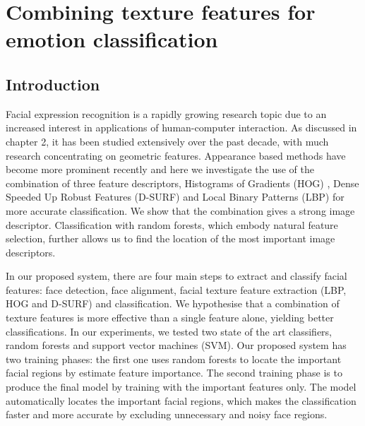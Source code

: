  

\chapter{Combining texture features for emotion classification}
\label{Ch_4}

\minitoc


\section{Introduction}

Facial expression recognition is a rapidly growing research topic due to an increased interest in applications of human-computer interaction. As discussed in chapter 2, it has been studied extensively over the past decade, with much research concentrating on geometric features.  Appearance based methods have become more prominent recently \citep{mishra2015survey,kumari2016fusion,yuqian2016action} and here we investigate the use of the combination of three feature descriptors, Histograms of Gradients (HOG) \citep{dalal2005histograms}, Dense Speeded Up Robust Features (D-SURF) \citep{lowe2004distinctive,uijlings2010real} and Local Binary Patterns (LBP) \citep{ojala1996comparative} for more accurate classification.  We show that the combination gives a strong image descriptor. Classification with random forests, which embody natural feature selection, further allows us to find the location of the most important image descriptors.  


In our proposed system, there are four main steps to extract and classify facial features: face detection, face alignment, facial texture feature extraction (LBP, HOG and D-SURF) and classification.
We hypothesise that a combination of texture features is more effective than a single feature alone, yielding better classifications. In our experiments, we tested two state of the art classifiers, random forests and support vector machines (SVM).
Our proposed system has two training phases: the first one uses random forests to locate the important facial regions by estimate feature importance. The second training phase is to produce the final model by training with the important features only. The model automatically locates the important facial regions, which makes the classification faster and more accurate by excluding unnecessary and noisy face regions.

